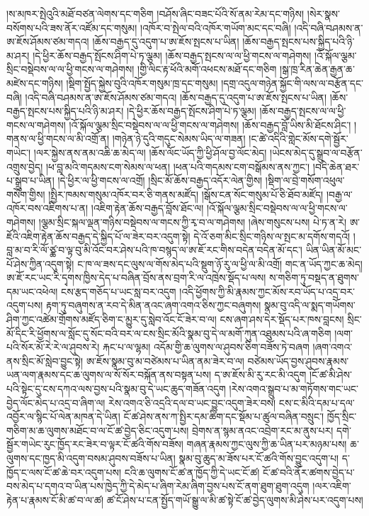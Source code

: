 \documentclass{article}
\begin{document}
།ས་མཁར་སྤེའུའི་མཐོ་བཙན་ལེགས་དང་གཅིག །བཤོས་ཞིང་བཟང་པོའི་སོ་ནམ་རེམ་དང་གཉིས། །སེར་སྣས་བསོགས་པའི་ཟས་ནོར་འཛོམ་དང་གསུམ། །འཁོར་བ་སྤེལ་བའི་འཁོར་གཡོག་མང་དང་བཞི། །འདི་བཞི་བཤམས་ན་ཨ་ཇོས་ཤོམས་ཙམ་གདའ། །ཆོས་བརྒྱད་དུ་འདུག་པ་ཨ་ཇོས་སྤངས་པ་ཡིན། །ཆོས་བརྒྱད་སྤངས་པས་སྐྱིད་པའི་ཉི་མ་ཤར། །དེ་ཕྱིར་ཆོས་བརྒྱད་སྤོངས་ཤིག་པེ་ཏ་ལྕམ། །ཆོས་བརྒྱད་སྤངས་ལ་ལ་ཕྱི་གངས་ལ་གཤེགས། །འོ་སྐོལ་ལྕམ་སྲིང་བསྡེབས་ལ་ལ་ཕྱི་གངས་ལ་གཤེགས། །གྱི་ལིང་རྟ་ཕོའི་མགོ་འཕངས་མཐོ་དང་གཅིག །སྒ་ཁྲ་རིན་ཆེན་རྒྱན་ཆ་མཛེས་དང་གཉིས། །སྡིག་སྤྱོད་སྐྱེས་བུའི་འཁོར་གསུམ་ཁྲ་དང་གསུམ། །དགྲ་འདུལ་གཉེན་སྐྱོང་གི་ལས་ལ་བརྩོན་དང་བཞི། །འདི་བཞི་བཤམས་ན་ཨ་ཇོས་ཤོམས་ཙམ་གདའ། །ཆོས་བརྒྱད་དུ་འདུག་པ་ཨ་ཇོས་སྤངས་པ་ཡིན། །ཆོས་བརྒྱད་སྤངས་པས་སྐྱིད་པའི་ཉི་མ་ཤར། །དེ་ཕྱིར་ཆོས་བརྒྱད་སྤོངས་ཤིག་པེ་ཏ་ལྕམ། །ཆོས་བརྒྱད་སྤངས་ལ་ལ་ཕྱི་གངས་ལ་གཤེགས། །འོ་སྐོལ་ལྕམ་སྲིང་བསྡེབས་ལ་ལ་ཕྱི་གངས་ལ་གཤེགས། །ཆོས་བརྒྱད་བློ་ཡིས་མི་ཐོངས་ཤིང་། །གནས་ལ་ཕྱི་གངས་ལ་མི་འགྲོ་ན། །གཉེན་ཉེ་དུའི་གདུང་སེམས་ཡིད་ལ་གཟན། །ང་ཚེ་འདིའི་གླེང་མོས་དགེ་སྦྱོར་གཡེང་། །ལར་སྐྱེས་ནས་ནམ་འཆི་ཆ་མེད་ལ། །ཆོས་ལོང་ཡོད་ཀྱི་ཕྱི་ཤོལ་བྱ་ལོང་མེད། །ཡེངས་མེད་དུ་སྒྲུབ་ལ་བརྩོན་འགྲུས་བྱེད། །ཕ་བླ་མའི་གདམས་ངག་སེམས་ལ་ཕན། །ཕན་པའི་གདམས་ངག་བསྒོམས་ནས་ཀྱང་། །བདེ་ཆེན་ཐར་པ་སྒྲུབ་པ་ཡིན། །དེ་ཕྱིར་ལ་ཕྱི་གངས་ལ་འགྲོ། །སྲིང་མོ་ཆོས་བརྒྱད་འདོར་ལེན་གྱིས། །སྡིག་ལ་བྲེ་གསོག་འཕུལ་གསོག་གྱིས། །སྤྱིར་ཁམས་གསུམ་འཁོར་བར་ཅི་གནས་མཛོད། །སྒོས་ངན་སོང་གསུམ་པོ་ཅི་ཐོབ་མཛོད། །བརྒྱ་ལ་འཁོར་བས་འཇིགས་པ་ན། །འཇིག་རྟེན་ཆོས་བརྒྱད་བློས་ཐོང་ལ། །འོ་སྐོལ་ལྕམ་སྲིང་བསྡེབས་ལ་ལ་ཕྱི་གངས་ལ་གཤེགས། །ལྕམ་སྲིང་སྐལ་ལྡན་གཉིས་བསྡེབས་ལ་གངས་ཀྱི་རྭ་བ་ལ་གཤེགས། །ཞེས་གསུངས་པས། པེ་ཏ་ན་རེ། ཨ་ཇོའི་འཇིག་རྟེན་ཆོས་བརྒྱད་དེ་སྐྱིད་པོ་ལ་ཟེར་བར་འདུག་སྟེ། དེ་འོ་ཅག་མིང་སྲིང་གཉིས་ལ་སྤང་མ་དགོས་གདའོ། །བླ་མ་བ་རི་ལོ་ཙྪ་བ་ལྟ་བུ་མི་འོང་བར་ཤེས་པའི་ཁ་བསྙད་ལ་ཨ་ཇོ་རང་གིས་བདེན་བདེན་མོ་དང་། ཡིན་ཡིན་མོ་མང་པོ་ཤེས་ཀྱིན་འདུག་སྟེ། ང་ཁ་ལ་ཟས་དང་ལུས་ལ་གོས་མེད་པའི་སྡུག་ཉོ་རུ་ལ་ཕྱི་ལ་མི་འགྲོ། གང་ན་ཡོད་ཀྱང་ཆ་མེད། ཨ་ཇོ་རང་ཡང་རི་དྭགས་ཁྱིས་དེད་པ་བཞིན་བྲོས་ནས་བྲག་རི་ལ་འཁྲེས་སྡོད་པ་ལས། ས་གཅིག་ཏུ་བསྡད་ན་ཐུགས་དམ་ཡང་འཕེལ། ངས་རྩད་གཅོད་པ་ཡང་སླ་བར་འདུག །འདི་ཕྱོགས་ཀྱི་མི་རྣམས་ཀྱང་མོས་རབ་ཡོད་པ་འདྲ་བར་འདུག་པས། རྟག་ཏུ་བཞུགས་ན་རབ་དེ་མིན་ནའང་ཞག་འགའ་ཅིས་ཀྱང་བཞུགས། སྣམ་བུ་འདི་ལ་སྨད་གཡོགས་ཤིག་ཀྱང་འཚེམ་གྲོགས་མཛོད་ཅིག་ང་མྱུར་དུ་སླེབ་འོང་ངོ་ཟེར་བ་ལ། ངས་ཞག་ཤས་དེར་སྡོད་པར་ཁས་བླངས། སྲིང་མོ་དིང་རི་ཕྱོགས་ལ་སློང་དུ་སོང་བའི་བར་ལ་ངས་སྲིང་མོའི་སྣམ་བུ་དེ་ལ་མགོ་ཀུན་འཐུམས་པའི་ཞ་གཅིག །ལག་པའི་སོར་མོ་རེ་རེ་ལ་ཤུབས་རེ། རྐང་པ་ལ་ལྷམ། འདོམ་གྱི་ཆ་ལུགས་ལ་ཤུབས་ཅིག་བཟོས་ཏེ་བཞག །ཞག་འགའ་ནས་སྲིང་མོ་སླེབ་བྱུང་སྟེ། ཨ་ཇོས་སྣམ་བུ་མ་བཙེམས་པ་ཡིན་ནམ་ཟེར་བ་ལ། བཙེམས་ཡོད་བྱས་ཤུབས་རྣམས་ཡན་ལག་རྣམས་དང་ཆ་ལུགས་ལ་སོ་སོར་བསྐོན་ནས་བསྟན་པས། ད་ཨ་ཇོས་མི་རུ་རང་མི་འདུག །ངོ་ཚ་མི་ཤེས་པའི་སྟེང་དུ་ངས་དཀའ་ལས་བྱས་པའི་སྣམ་བུ་དེ་ཡང་ཆུད་གཟོན་འདུག །རེས་འགའ་སྒྲུབ་པ་མ་གཏོགས་གང་ཡང་བྱེད་ལོང་མེད་པ་འདྲ་བ་ཞིག་ལ། རེས་འགའ་ཅི་འདྲའི་དལ་བ་ཡང་བྱུང་འདུག་ཟེར་བས། ངས་ང་མིའི་དམ་པ་དལ་འབྱོར་ལ་སྙིང་པོ་ལེན་མཁན་དེ་ཡིན། ངོ་ཚ་ཤེས་ནས་ཀ་སྤྱིར་དམ་ཚིག་དང་སྡོམ་པ་ཚུལ་བཞིན་བསྲུང་། ཁྱོད་སྲིང་གཅིག་མ་ཆ་ལུགས་མཐོང་བ་ལ་ངོ་ཚ་བྱེད་ཅིང་འདུག་པས། བྲེགས་ན་སྙམ་ནའང་འབྲེག་རང་མ་ནུས་པར། དགེ་སྦྱོར་གཡེང་རུང་ཁྱོད་རང་ཟེར་བ་ལྟར་ངོ་ཚའི་གོས་བཟོས། གཞན་རྣམས་ཀྱང་ལུས་ཀྱི་ཆ་ཡིན་པར་མཉམ་པས། ཆ་ལུགས་དང་ཁྱད་མི་འདུག་བསམ་ཤུབས་བཟོས་པ་ཡིན། སྣམ་བུ་ཆུད་མ་ཟོས་པར་ངོ་ཚའི་གོས་བྱུང་འདུག་པ། ད་ཁྱོད་ང་ལས་ངོ་ཚ་ཆེ་བར་འདུག་པས། ངའི་ཆ་ལུགས་ངོ་ཚ་ན་ཁྱོད་ཀྱི་དེ་ཡང་ངོ་ཚ། ངོ་ཚ་བའི་ནོར་ཚགས་བྱེད་པ་བས་མེད་པ་དགའ་བ་ཡིན་པས་ཁྱེད་ཀྱི་དེ་མེད་པ་ཞིག་རེམ་ཞིག་བྱས་པས་ངོ་ནག་ཐུག་ཐུག་འདུག །ལར་འཇིག་རྟེན་པ་རྣམས་ངོ་མི་ཚ་བ་ལ་ཚ། ཚ་ངོ་ཤེས་པ་ངན་སྤྱོད་གཡོ་སྒྱུ་ལ་མི་ཚ་སྟེ་ངོ་ཚ་བྱེད་ལུགས་མི་ཤེས་པར་འདུག་པས། 
\end{document}
